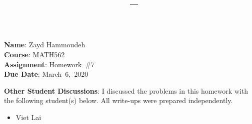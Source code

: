 \documentclass{report}
\title{\textbf{\course\ -- \assnName}}
\author{\name}
\newcommand{\name}{Zayd Hammoudeh}
\newcommand{\course}{MATH562}
\newcommand{\assnName}{Homework~\#7}
\newcommand{\dueDate}{March~6,~2020}
\begin{document}
  \maketitle

  \noindent
  \textbf{Name}: \name\\
  \textbf{Course}: \course\\
  \textbf{Assignment}: \assnName\\
  \textbf{Due Date}: \dueDate

  \noindent
  \textbf{Other Student Discussions}: I discussed the problems in this homework with the following student(s) below.  All write-ups were prepared independently.
  \vspace{-1em}
  \begin{itemize}
    \item Viet Lai
  \end{itemize}

  \newpage
  
  \newpage
  
  \newpage
  
  \newpage
  
  \newpage
  
  \newpage
  
  \newpage
  
  \newpage
  
  \newpage
  
  \newpage
  
  \newpage
  
\end{document}
